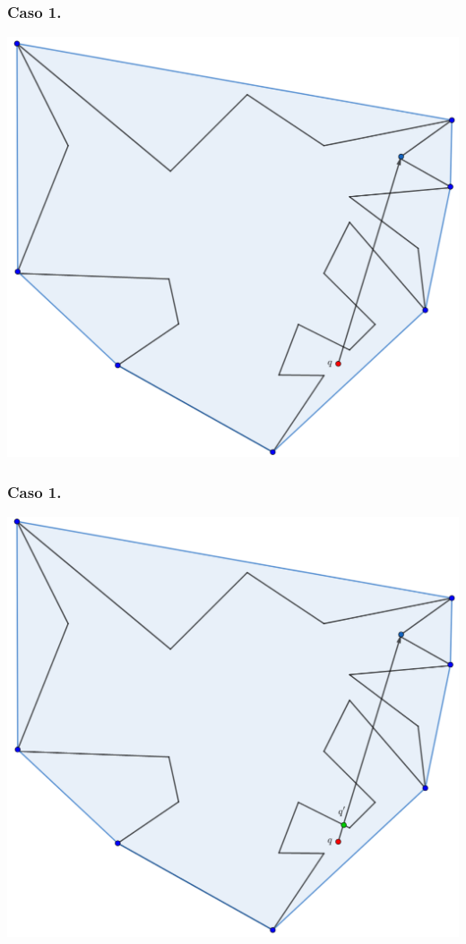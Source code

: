 \begin{frame}
  \frametitle{Caso 1.}
  \centering \includegraphics[width=0.50 \paperwidth]{images/CasosQExterno/P03.png}
\end{frame}

\begin{frame}
  \frametitle{Caso 1.}
  \centering \includegraphics[width=0.50 \paperwidth]{images/CasosQExterno/P04.png}
\end{frame}

